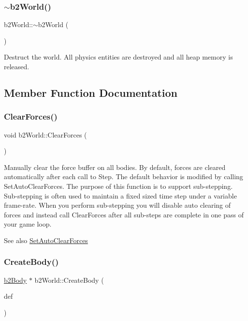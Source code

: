 \subsubsection{\texorpdfstring{$\sim$b2World()}{~b2World()}}
{\footnotesize\ttfamily b2\+World\+::$\sim$b2\+World (\begin{DoxyParamCaption}{ }\end{DoxyParamCaption})}



Destruct the world. All physics entities are destroyed and all heap memory is released. 



\subsection{Member Function Documentation}
\mbox{\label{classb2_world_ac082ab4c4ad0b1c5ec4674315eeec643}} 
\subsubsection{\texorpdfstring{ClearForces()}{ClearForces()}}
{\footnotesize\ttfamily void b2\+World\+::\+Clear\+Forces (\begin{DoxyParamCaption}{ }\end{DoxyParamCaption})}

Manually clear the force buffer on all bodies. By default, forces are cleared automatically after each call to Step. The default behavior is modified by calling Set\+Auto\+Clear\+Forces. The purpose of this function is to support sub-\/stepping. Sub-\/stepping is often used to maintain a fixed sized time step under a variable frame-\/rate. When you perform sub-\/stepping you will disable auto clearing of forces and instead call Clear\+Forces after all sub-\/steps are complete in one pass of your game loop. \begin{DoxySeeAlso}{See also}
\mbox{\hyperlink{classb2_world_aa2bced28ddef5bbb00ed5666e5e9f620}{Set\+Auto\+Clear\+Forces}} 
\end{DoxySeeAlso}
\mbox{\label{classb2_world_a2eb36e967e43294bfa03ec3d177c2dae}} 
\subsubsection{\texorpdfstring{CreateBody()}{CreateBody()}}
{\footnotesize\ttfamily \mbox{\hyperlink{classb2_body}{b2\+Body}} $\ast$ b2\+World\+::\+Create\+Body (\begin{DoxyParamCaption}\item[{const \mbox{\hyperlink{structb2_body_def}{b2\+Body\+Def}} $\ast$}]{def }\end{DoxyParamCaption})}

